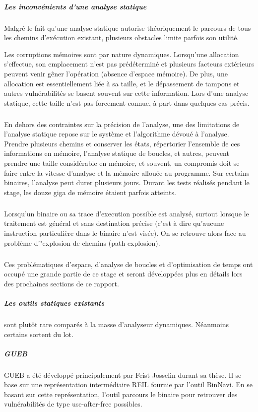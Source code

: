 \subparagraph{Les inconvénients d'une analyse statique}

Malgré le fait qu'une analyse statique autorise théoriquement le parcours de tous les chemins d'exécution existant, plusieurs obstacles
limite parfois son utilité.\newline

Les corruptions mémoires sont par nature dynamiques. Lorsqu'une allocation s'effectue, son emplacement n'est pas prédéterminé
et plusieurs facteurs extérieurs peuvent venir gêner l'opération (absence d'espace mémoire). De plus, une allocation
est essentiellement liée à sa taille, et le dépassement de tampons et autres vulnérabilités se basent souvent sur cette information.
Lors d'une analyse statique, cette taille n'est pas forcement connue, à part dans quelques cas précis.
\subparagraph{}

En dehors des contraintes sur la précision de l'analyse, une des limitations de l'analyse statique repose sur le système et l'algorithme
dévoué à l'analyse. Prendre plusieurs chemins et conserver les états, répertorier l'ensemble de ces informations en mémoire, l'analyse
statique de boucles, et autres, peuvent prendre une taille considérable en mémoire, et souvent, un compromis doit se faire entre la vitesse
d'analyse et la mémoire allouée au programme. Sur certains binaires, l'analyse peut durer plusieurs jours. Durant les tests réalisés pendant le
stage, les douze giga de mémoire étaient parfois atteints.

\subparagraph{}
Lorsqu'un binaire ou sa trace d'execution possible est analysé, surtout lorsque le traitement est général et sans destination précise (c'est à dire
qu'aucune instruction particulière dans le binaire n'est visée). On se retrouve alors face au problème d'"explosion de chemins (path explosion).

\subparagraph{}
Ces problématiques d'espace, d'analyse de boucles et d'optimisation de temps ont occupé une grande partie de ce stage et seront développées plus
en détails lors des prochaines sections de ce rapport.

\subparagraph{Les outils statiques existants} sont plutôt rare comparés à la masse d'analyseur dynamiques. Néanmoins certains sortent du lot.

\subparagraph{GUEB}
GUEB a été développé principalement par Feist Josselin durant sa thèse. Il se base sur une représentation intermédiaire
REIL fournie par l'outil BinNavi. En se basant sur cette représentation, l'outil parcours le binaire pour retrouver des vulnérabilités
de type use-after-free possibles.

